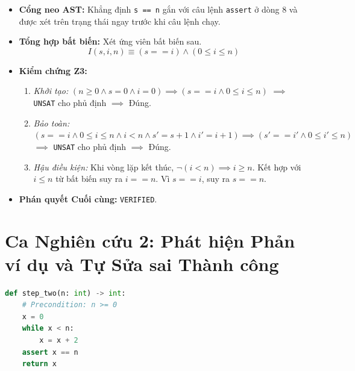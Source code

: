 \begin{itemize}
    \item \textbf{Cổng neo AST:} Khẳng định \texttt{s == n} gắn với câu lệnh \texttt{assert} ở dòng 8 và được xét trên trạng thái ngay trước khi câu lệnh chạy.
    \item \textbf{Tổng hợp bất biến:} Xét ứng viên bất biến sau.
    \begin{equation*}
    I(s, i, n) \equiv (s == i) \land (0 \le i \le n)
    \end{equation*}
    \item \textbf{Kiểm chứng Z3:}
    \begin{enumerate}
        \item \textit{Khởi tạo:} $(n \ge 0 \land s = 0 \land i = 0) \implies (s == i \land 0 \le i \le n)$ $\implies$ \texttt{UNSAT} cho phủ định $\implies$ Đúng.
        \item \textit{Bảo toàn:} $(s == i \land 0 \le i \le n \land i < n \land s' = s + 1 \land i' = i + 1) \implies (s' == i' \land 0 \le i' \le n)$ $\implies$ \texttt{UNSAT} cho phủ định $\implies$ Đúng.
        \item \textit{Hậu điều kiện:} Khi vòng lặp kết thúc, $\neg (i < n) \implies i \ge n$. Kết hợp với $i \le n$ từ bất biến suy ra $i == n$. Vì $s == i$, suy ra $s == n$.
    \end{enumerate}
    \item \textbf{Phán quyết Cuối cùng:} \texttt{VERIFIED}.
\end{itemize}

\section{Ca Nghiên cứu 2: Phát hiện Phản ví dụ và Tự Sửa sai Thành công}
\begin{lstlisting}[language=Python, caption={Mã nguồn bài toán bước nhảy step\_two\_buggy}]
def step_two(n: int) -> int:
    # Precondition: n >= 0
    x = 0
    while x < n:
        x = x + 2
    assert x == n
    return x
\end{lstlisting}

